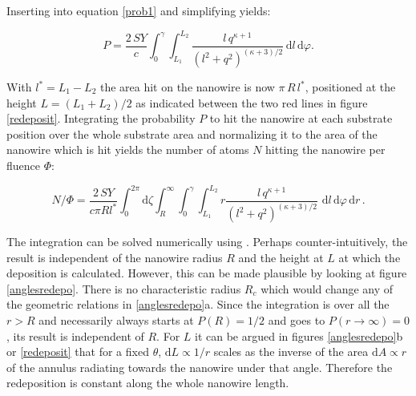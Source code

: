Inserting into equation \ref{prob1} and simplifying yields:

\begin{equation}
\label{prob2}
P = \frac{2\,SY}{c} \int_0^{\gamma} \! \int_{L_1}^{L_2} \!  \frac{l\,q^{\kappa+1}}{(l^2 + q^2)^{(\kappa + 3)/2}} \,\mathrm{d}l \, \mathrm{d}\varphi.
\end{equation}

With $l^*=L_1-L_2$ the area hit on the nanowire is now $\pi \, R \, l^*$, positioned at the height $L= (L_1+L_2)/2$ as indicated between the two red lines in figure \ref{redeposit}. Integrating the probability $P$ to hit the nanowire at each substrate position over the whole substrate area and normalizing it to the area of the nanowire which is hit yields the number of atoms $N$ hitting the nanowire per fluence $\Phi$:

\begin{equation}
\label{prob2}
N/\Phi = \frac{2\,SY}{c \pi Rl^*} \int_0^{2\pi}\! \mathrm{d}\zeta \int_R^{\infty} \!
\int_0^{\gamma} \! \int_{L_1}^{L_2} \! r \frac{l\,q^{\kappa+1}}{(l^2 + q^2)^{(\kappa + 3)/2}}\,\,\mathrm{d}l \, \mathrm{d}\varphi\,\mathrm{d}r \, .
\end{equation}

The integration can be solved numerically using . Perhaps counter-intuitively, the result is independent of the nanowire radius $R$ and the height at $L$ at which the deposition is calculated. However, this can be made plausible by looking at figure \ref{anglesredepo}. There is no characteristic radius $R_c$ which would change any of the geometric relations in \ref{anglesredepo}a. Since the integration is over all the $r > R$ and necessarily always starts at $P(R) =1/2$ and goes to $P(r\rightarrow \infty) =0$, its result is independent of $R$. For $L$ it can be argued in figures \ref{anglesredepo}b or \ref{redeposit} that for a fixed $\theta$, $\mathrm{d}L \propto 1/r$ scales as the inverse of the area $\mathrm{d}A \propto r$ of the annulus radiating towards the nanowire under that angle. Therefore the redeposition is constant along the whole nanowire length. 

 
